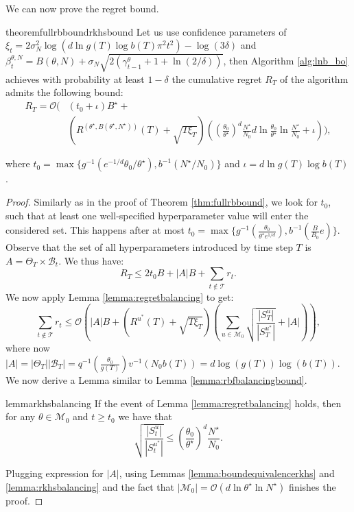 \documentclass{article}
\theoremstyle{plain}
\theoremstyle{definition}
\theoremstyle{remark}
\theoremstyle{plain}
\begin{document}
We can now prove the regret bound.
\begin{restatable}[]{theorem}{fullrbboundrkhsbound}
\label{thm:fullrbboundrkhsbound}
    Let us use confidence parameters of $\xi_t = 2 \sigma_N^2 \log (d \ln g(T) \log b(T)\pi^2 t^2) - \log(3\delta) $ and $\beta^{\theta, N}_t = B(\theta, N) + \sigma_N \sqrt{2 (\gamma^{\theta}_{t-1} + 1 + \ln (2/\delta))}$, then
 Algorithm \ref{alg:lnb_bo} achieves with probability at least $1 - \delta$ the cumulative regret $R_T$ of the algorithm admits the following bound:
\begin{align*}
    R_T = \mathcal{O} \Bigg(& \left(t_0+ \iota \right)B^\star + \\
    & \left(R^{(\theta^\star, B(\theta^\star, N^\star))}(T) + \sqrt{T\xi_T}  \right) \left(\left(\frac{\theta_0}{\theta^\star}\right)^{d}  \frac{N^\star}{N_0} d \ln\frac{\theta_0}{\theta^\star}   \ln \frac{N^\star}{N_0}   + \iota \right) \Bigg),
\end{align*}
     
where $t_0 = \max\{ g^{-1}\left(e^{-1/d}\theta_0/\theta^\star \right), b^{-1}(N^\star / N_0)\}$ and $\iota = d \ln g(T) \log b(T)$. 
\end{restatable}


\begin{proof}
    Similarly as in the proof of Theorem \ref{thm:fullrbbound}, we look for $t_0$, such that at least one well-specified hyperparameter value will enter the considered set. This happens after at most $t_0 = \max\{g^{-1}(\frac{\theta_0}{\theta^\star e^{1/d}}), b^{-1}(\frac{B}{B_0}e)\}$. Observe that the set of all hyperparameters introduced by time step $T$ is $A = \Theta_T \times \mathcal{B}_t$. We thus have:
    \begin{equation*}
        R_T \le 2t_0B + |A|B + \sum_{t \notin \mathcal{T}} r_t.
    \end{equation*}
    We now apply Lemma \ref{lemma:regretbalancing}  to get:
    \begin{equation*}
        \sum_{t \notin \mathcal{T}} r_t \le \mathcal{O} \left(|A|B + \left(R^{u^*}(T) + \sqrt{T\xi_T}  \right) \left(\sum_{u \in \mathcal{M}_0}\sqrt{\frac{|S_T^{u}|}{|S_T^{u^*}|}} + |A| \right) \right),
    \end{equation*}
    where now $|A| = |\Theta_T||\mathcal{B}_T| = q^{-1}(\frac{\theta_0}{g(T)}) v^{-1}(N_0 b(T)) = d \log(g(T)) \log(b(T))$. We now derive a Lemma similar to Lemma \ref{lemma:rbfbalancingbound}.
\begin{restatable}[]{lemma}{rkhsbalancing}
\label{lemma:rkhsbalancing}
If the event of Lemma \ref{lemma:regretbalancing} holds, then for any $\theta \in \mathcal{M}_0$ and $t \ge t_0$ we have that $$\sqrt{\frac{|S_t^{u}|}{|S_t^{u^*}|}} \le \left(\frac{\theta_0}{\theta^\star}\right)^{d}\frac{N^\star}{N_0} .$$

\end{restatable}


Plugging expression for $|A|$, using Lemmas \ref{lemma:boundequivalencerkhs} and \ref{lemma:rkhsbalancing} and the fact that $|\mathcal{M}_0| = \mathcal{O}(d\ln \theta^\star \ln N^\star)$ finishes the proof.

\end{proof}
\end{document}
